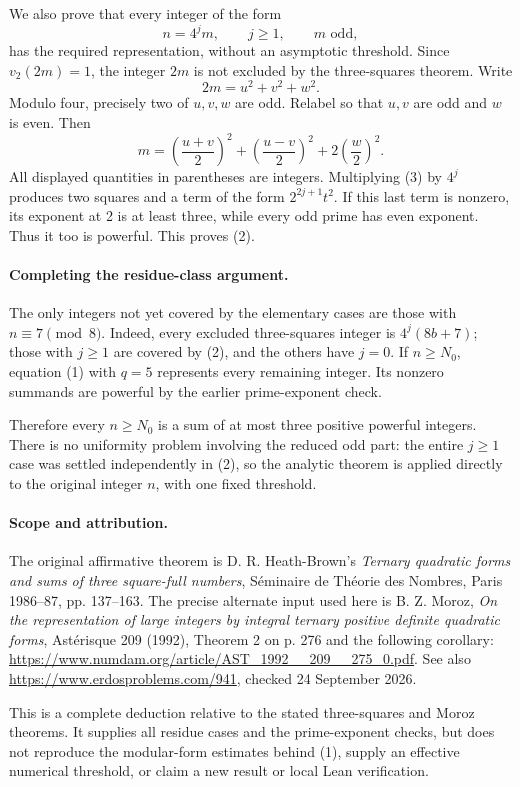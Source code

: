 We also prove that every integer of the form
\[
 n=4^j m,\qquad j\geq1,\qquad m\text{ odd}, \tag{2}
\]
has the required representation, without an asymptotic threshold. Since \(v_2(2m)=1\), the integer \(2m\) is not excluded by the three-squares theorem. Write
\[
 2m=u^2+v^2+w^2.
\]
Modulo four, precisely two of \(u,v,w\) are odd. Relabel so that \(u,v\) are odd and \(w\) is even. Then
\[
 m=\left(\frac{u+v}{2}\right)^2+
   \left(\frac{u-v}{2}\right)^2+
   2\left(\frac w2\right)^2. \tag{3}
\]
All displayed quantities in parentheses are integers. Multiplying (3) by \(4^j\) produces two squares and a term of the form
\(2^{2j+1}t^2\). If this last term is nonzero, its exponent at 2 is at least three, while every odd prime has even exponent. Thus it too is powerful. This proves (2).

\paragraph{Completing the residue-class argument.}
The only integers not yet covered by the elementary cases are those with \(n\equiv7\pmod8\). Indeed, every excluded three-squares integer is \(4^j(8b+7)\); those with \(j\geq1\) are covered by (2), and the others have \(j=0\). If \(n\geq N_0\), equation (1) with \(q=5\) represents every remaining integer. Its nonzero summands are powerful by the earlier prime-exponent check.

Therefore every \(n\geq N_0\) is a sum of at most three positive powerful integers. There is no uniformity problem involving the reduced odd part: the entire \(j\geq1\) case was settled independently in (2), so the analytic theorem is applied directly to the original integer \(n\), with one fixed threshold.

\paragraph{Scope and attribution.}
The original affirmative theorem is D. R. Heath-Brown's \emph{Ternary quadratic forms and sums of three square-full numbers}, S\'eminaire de Th\'eorie des Nombres, Paris 1986--87, pp. 137--163. The precise alternate input used here is B. Z. Moroz, \emph{On the representation of large integers by integral ternary positive definite quadratic forms}, Ast\'erisque 209 (1992), Theorem 2 on p. 276 and the following corollary: \url{https://www.numdam.org/article/AST_1992__209__275_0.pdf}. See also \url{https://www.erdosproblems.com/941}, checked 24 September 2026.

This is a complete deduction relative to the stated three-squares and Moroz theorems. It supplies all residue cases and the prime-exponent checks, but does not reproduce the modular-form estimates behind (1), supply an effective numerical threshold, or claim a new result or local Lean verification.
